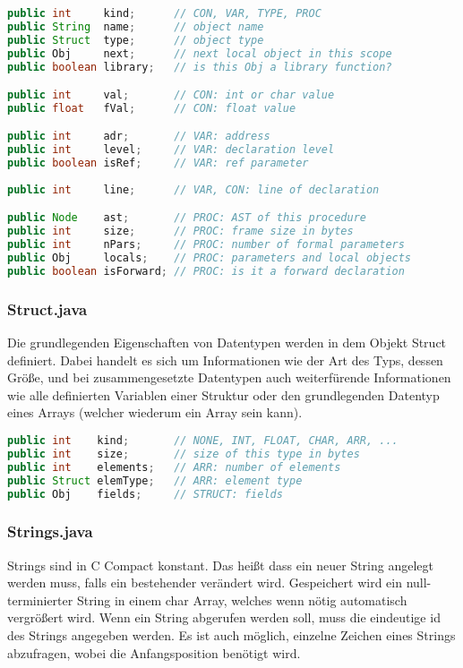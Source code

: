 \begin{lstlisting}[language=Java]
public int     kind;      // CON, VAR, TYPE, PROC
public String  name;      // object name
public Struct  type;      // object type
public Obj     next;      // next local object in this scope
public boolean library;   // is this Obj a library function?

public int     val;       // CON: int or char value
public float   fVal;      // CON: float value

public int     adr;       // VAR: address
public int     level;     // VAR: declaration level
public boolean isRef;     // VAR: ref parameter
	
public int     line;      // VAR, CON: line of declaration

public Node    ast;       // PROC: AST of this procedure
public int     size;      // PROC: frame size in bytes
public int     nPars;     // PROC: number of formal parameters
public Obj     locals;    // PROC: parameters and local objects
public boolean isForward; // PROC: is it a forward declaration
\end{lstlisting}


\subsubsection{Struct.java}

Die grundlegenden Eigenschaften von Datentypen werden in dem Objekt Struct definiert. Dabei handelt es sich um Informationen wie der Art des Typs, dessen Gr\"o\ss{}e, und bei zusammengesetzte Datentypen auch weiterf\"urende Informationen wie alle definierten Variablen einer Struktur oder den grundlegenden Datentyp eines Arrays (welcher wiederum ein Array sein kann).

\begin{lstlisting}[language=Java]
public int    kind;       // NONE, INT, FLOAT, CHAR, ARR, ...
public int    size;       // size of this type in bytes
public int    elements;   // ARR: number of elements
public Struct elemType;   // ARR: element type
public Obj    fields;     // STRUCT: fields
\end{lstlisting}

\subsubsection{Strings.java}

Strings sind in C Compact konstant. Das hei\ss{}t dass ein neuer String angelegt werden muss, falls ein bestehender ver\"andert wird. Gespeichert wird ein null-terminierter String in einem char Array, welches wenn n\"otig automatisch vergr\"o\ss{}ert wird. Wenn ein String abgerufen werden soll, muss die eindeutige id des Strings angegeben werden. Es ist auch m\"oglich, einzelne Zeichen eines Strings abzufragen, wobei die Anfangsposition ben\"otigt wird.


